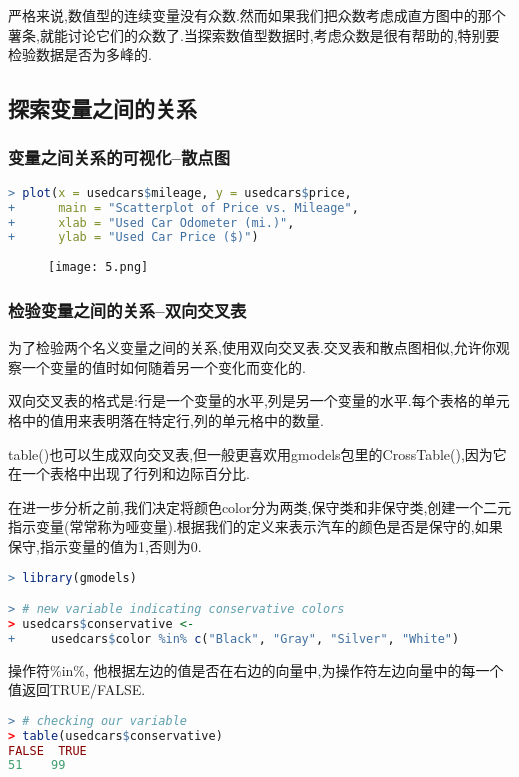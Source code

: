 \documentclass[11pt,a4paper,oneside]{book}
\begin{document}
严格来说,数值型的连续变量没有众数.然而如果我们把众数考虑成直方图中的那个薯条,就能讨论它们的众数了.当探索数值型数据时,考虑众数是很有帮助的,特别要检验数据是否为多峰的.

\subsection{探索变量之间的关系}
\subsubsection{变量之间关系的可视化--散点图}
\begin{lstlisting}[language=r]
> plot(x = usedcars$mileage, y = usedcars$price,
+      main = "Scatterplot of Price vs. Mileage",
+      xlab = "Used Car Odometer (mi.)",
+      ylab = "Used Car Price ($)")
\end{lstlisting}
\begin{figure}[H]
	\centering
	\texttt{[image: 5.png]}  
\end{figure}
\subsubsection{检验变量之间的关系--双向交叉表}
为了检验两个名义变量之间的关系,使用双向交叉表.交叉表和散点图相似,允许你观察一个变量的值时如何随着另一个变化而变化的.

双向交叉表的格式是:行是一个变量的水平,列是另一个变量的水平.每个表格的单元格中的值用来表明落在特定行,列的单元格中的数量.

table()也可以生成双向交叉表,但一般更喜欢用gmodels包里的CrossTable(),因为它在一个表格中出现了行列和边际百分比.

在进一步分析之前,我们决定将颜色color分为两类,保守类和非保守类,创建一个二元指示变量(常常称为哑变量).根据我们的定义来表示汽车的颜色是否是保守的,如果保守,指示变量的值为1,否则为0.
\begin{lstlisting}[language=r]
> library(gmodels)

> # new variable indicating conservative colors
> usedcars$conservative <-
+     usedcars$color %in% c("Black", "Gray", "Silver", "White")
\end{lstlisting}

\begin{tcolorbox}[colback=pink!10!white,colframe=pink!100!black]
操作符\%in\%, 他根据左边的值是否在右边的向量中,为操作符左边向量中的每一个值返回TRUE/FALSE.
\end{tcolorbox}

\begin{lstlisting}[language=r]
> # checking our variable
> table(usedcars$conservative)
FALSE  TRUE 
51    99 
\end{lstlisting}
\end{document}
